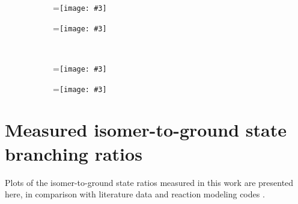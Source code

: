 \documentclass[3p]{elsarticle}
\newcommand{\subfigimg}[3][,]{%
  \setbox1=\hbox{\texttt{[image: \#3]}}%
  \leavevmode\rlap{\usebox1}%
  \rlap{\hspace*{50pt}\raisebox{\dimexpr\ht1-2\baselineskip}{#2}}%
  \phantom{\usebox1}%
}
\begin{document}
\begin{figure}
    \centering
    \begin{subfigure}[t]{0.49\textwidth}
        \centering
        \subfigimg[scale=0.47]{}{./figures/90Nb.pdf}
         \label{fig:90Nb}
    \end{subfigure}%
     \begin{subfigure}[t]{0.49\textwidth}
        \centering
        \subfigimg[scale=0.47]{}{./figures/91mNb.pdf}
         \label{fig:91mNb}
    \end{subfigure}%
    \\
    \begin{subfigure}[t]{0.49\textwidth}
        \centering
        \subfigimg[scale=0.47]{}{./figures/92mNb.pdf}
                 \label{fig:92mNb}
    \end{subfigure}
     \begin{subfigure}[t]{0.49\textwidth}
        \centering
        \subfigimg[scale=0.47]{}{./figures/93mMo.pdf}
         \label{fig:93mMo}
    \end{subfigure}%
     \label{fig:xs_curves_p5}
\end{figure}




% 
% 
\section{Measured isomer-to-ground state branching ratios } \label{ibr_figures}

Plots of the isomer-to-ground state ratios measured in this work are presented here, in comparison with literature data and reaction modeling codes \cite{MICHEL1997153,Ditroi2008,Titarenko2011,Graves2016}.
\end{document}
